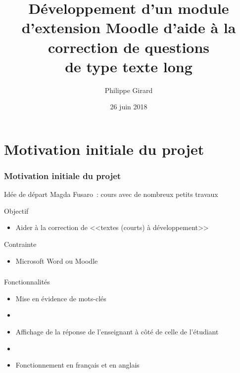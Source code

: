 \documentclass{beamer}
\title[Pr\'esentation du projet de ma\^itrise]{D\'eveloppement d'un module d'extension Moodle d'aide \`a la correction de questions\\de type \og texte long \fg{} }
\author{Philippe Girard}
\institute{Universit\'e du Qu\'ebec \`a Montr\'eal}
\date{26 juin 2018}
\begin{document}
  \begin{frame}[plain]
    \titlepage
  \end{frame}
  
  \begin{frame}[plain]
    \tableofcontents[hideallsubsections]
  \end{frame}
  
  \section[Introduction]{Motivation initiale du projet}
  \begin{frame}
    \frametitle{Motivation initiale du projet}

    \begin{block}{Id\'ee de d\'epart}
      Magda Fusaro~: cours avec de nombreux petits travaux 
    \end{block}

    \vfill

    \begin{block}{Objectif}
      \begin{itemize}
        \item Aider \`a la correction de <<textes (courts) \`a d\'eveloppement>>
      \end{itemize}
    \end{block}

    \vfill

    \begin{block}{Contrainte}
      \begin{itemize}
        \item Microsoft Word ou Moodle
      \end{itemize}
    \end{block}
    \vfill
  \end{frame}
  
  \begin{frame}
    \frametitle{\insertsection}
    \begin{block}{Fonctionnalit\'es}
      \begin{itemize}
        \item Mise en \'evidence \alert{de mots-cl\'es}
        \item[]
        \item Affichage de la r\'eponse de l'enseignant \`a c\^ot\'e de celle de l'\'etudiant
        \item[]
        \item Fonctionnement en fran\c{c}ais et en anglais
      \end{itemize}
    \end{block}
  \end{frame}
  
\end{document}
